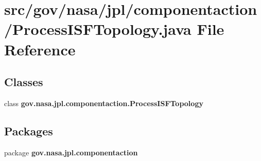 \section{src/gov/nasa/jpl/componentaction/\+Process\+I\+S\+F\+Topology.java File Reference}
\label{_process_i_s_f_topology_8java}
\subsection*{Classes}
\begin{DoxyCompactItemize}
\item 
class {\bf gov.\+nasa.\+jpl.\+componentaction.\+Process\+I\+S\+F\+Topology}
\end{DoxyCompactItemize}
\subsection*{Packages}
\begin{DoxyCompactItemize}
\item 
package {\bf gov.\+nasa.\+jpl.\+componentaction}
\end{DoxyCompactItemize}
